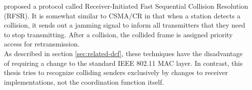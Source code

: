 \cite{jibukumar2015} proposed a protocol called Receiver-Initiated Fast Sequential Collision Resolution (RFSR). It is somewhat similar to CSMA/CR \cite{choi2013} in that when a station detects a collision, it sends out a jamming signal to inform all transmitters that they need to stop transmitting. After a collision, the collided frame is assigned priority access for retransmission.\\

As described in section \ref{sec:related-dcf}, these techniques have the disadvantage of requiring a change to the standard IEEE 802.11 \gls{MAC} layer. In contrast, this thesis tries to recognize colliding senders exclusively by changes to receiver implementations, not the coordination function itself.
